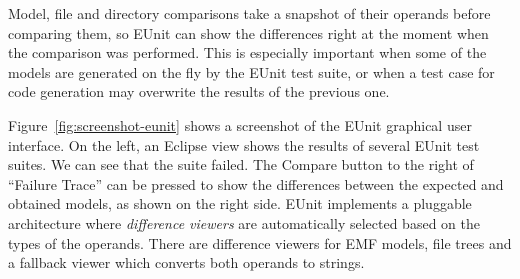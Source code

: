 Model, file and directory comparisons take a snapshot of their operands before comparing them, so EUnit can show the differences right at the moment when the comparison was performed. This is especially important when some of the models are generated on the fly by the EUnit test suite, or when a test case for code generation may overwrite the results of the previous one.

Figure~\ref{fig:screenshot-eunit} shows a screenshot of the EUnit graphical user interface. On the left, an Eclipse view shows the results of several EUnit test suites. We can see that the  suite failed. The Compare button to the right of ``Failure Trace'' can be pressed to show the differences between the expected and obtained models, as shown on the right side. EUnit implements a pluggable architecture where \emph{difference viewers} are automatically selected based on the types of the operands. There are difference viewers for EMF models, file trees and a fallback viewer which converts both operands to strings.

